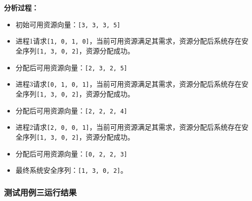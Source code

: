 \documentclass[12pt, a4paper, oneside]{ctexart}
\begin{document}
\textbf{分析过程：}
\begin{itemize}
    \item 初始可用资源向量：\texttt{[3, 3, 3, 5]}
    \item 进程1请求\texttt{[1, 0, 1, 0]}，当前可用资源满足其需求，资源分配后系统存在安全序列\texttt{[1, 3, 0, 2]}，资源分配成功。
    \item 分配后可用资源向量：\texttt{[2, 3, 2, 5]}
    \item 进程3请求\texttt{[0, 1, 0, 1]}，当前可用资源满足其需求，资源分配后系统存在安全序列\texttt{[1, 3, 0, 2]}，资源分配成功。
    \item 分配后可用资源向量：\texttt{[2, 2, 2, 4]}
    \item 进程2请求\texttt{[2, 0, 0, 1]}，当前可用资源满足其需求，资源分配后系统存在安全序列\texttt{[1, 3, 0, 2]}，资源分配成功。
    \item 分配后可用资源向量：\texttt{[0, 2, 2, 3]}
    \item 最终系统安全序列：\texttt{[1, 3, 0, 2]}。
\end{itemize}

\subsubsection{测试用例三运行结果}
\end{document}
